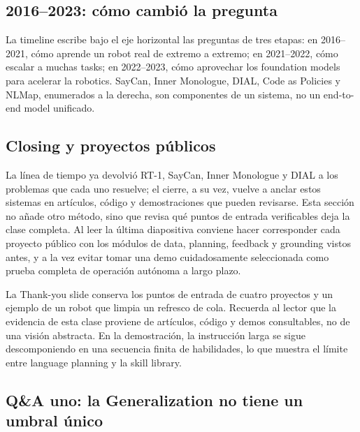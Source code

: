 \subsection{2016--2023: cómo cambió la pregunta}

La timeline escribe bajo el eje horizontal las preguntas de tres etapas: en 2016--2021, cómo aprende un robot real de extremo a extremo; en 2021--2022, cómo escalar a muchas tasks; en 2022--2023, cómo aprovechar los foundation models para acelerar la robotics. SayCan, Inner Monologue, DIAL, Code as Policies y NLMap, enumerados a la derecha, son componentes de un sistema, no un end-to-end model unificado.


\subsection{Closing y proyectos públicos}

La línea de tiempo ya devolvió RT-1, SayCan, Inner Monologue y DIAL a los problemas que cada uno resuelve; el cierre, a su vez, vuelve a anclar estos sistemas en artículos, código y demostraciones que pueden revisarse. Esta sección no añade otro método, sino que revisa qué puntos de entrada verificables deja la clase completa. Al leer la última diapositiva conviene hacer corresponder cada proyecto público con los módulos de data, planning, feedback y grounding vistos antes, y a la vez evitar tomar una demo cuidadosamente seleccionada como prueba completa de operación autónoma a largo plazo.

La Thank-you slide conserva los puntos de entrada de cuatro proyectos y un ejemplo de un robot que limpia un refresco de cola. Recuerda al lector que la evidencia de esta clase proviene de artículos, código y demos consultables, no de una visión abstracta. En la demostración, la instrucción larga se sigue descomponiendo en una secuencia finita de habilidades, lo que muestra el límite entre language planning y la skill library.


\subsection{Q\&A uno: la Generalization no tiene un umbral único}

